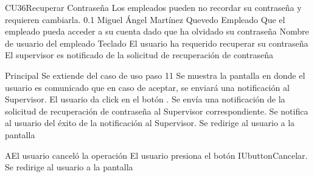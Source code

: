 \begin{UseCase}{CU36}{Recuperar Contrase\~na}
{
    Los empleados pueden no recordar su contrase\~na y requieren cambiarla.
}
    {
	\color{Gray} 0.1
    }
    {
	\color{Gray} Miguel \'Angel Mart\'inez Quevedo
    }
    {
	\color{Gray}
    }
    {
	Empleado
    }
    {
	Que el empleado pueda acceder a su cuenta dado que ha olvidado su contrase\~na
    }
    {
	Nombre de usuario del empleado
    }
    {
	Teclado
    }
    {}
    {}
    {
	El usuario ha requerido recuperar su contrase\~na
    }
    {
	El supervisor es notificado de la solicitud de recuperaci\'on de contrase\~na
    }
    {}
    {}
    {}
    {}
\end{UseCase}

\begin{UCtrayectoria}{Principal}
    \UCpaso Se extiende del caso de uso  paso 11
    \UCpaso Se muestra la pantalla  en
    donde el usuario es comunicado que en caso de aceptar, se enviar\'a una notificaci\'on al
    Supervisor.
    \UCpaso El usuario da click en el bot\'on .
    \UCpaso Se env\'ia una notificaci\'on de la solicitud de recuperaci\'on de contrase\~na al
    Supervisor correspondiente. 
    \UCpaso Se notifica al usuario del \'exito de la notificaci\'on al Supervisor.
    \UCpaso Se redirige al usuario a la pantalla 
\end{UCtrayectoria}

\begin{UCtrayectoriaA}{A}{El usuario cancel\'o la operaci\'on}
    \UCpaso El usuario presiona el bot\'on IUbutton{Cancelar}.
    \UCpaso Se redirige al usuario a la pantalla 
\end{UCtrayectoriaA}

